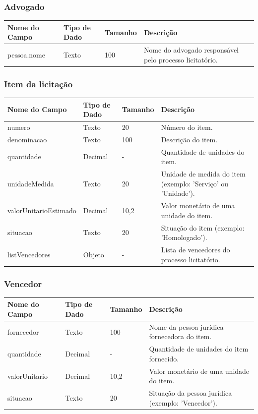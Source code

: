 \documentclass[
	12pt,				%
	oneside,			%
	a4paper,			%
	chapter=TITLE,		%
	section=TITLE,		%
	english,			%
	brazil				%
	]{abntex2}
\begin{document}
\newpage
\subsubsection*{Advogado}
\begin{longtable}{|p{4cm}|p{3cm}|p{2cm}|p{6cm}|}
\hline
\textbf{Nome do Campo} & \textbf{Tipo de Dado} & \textbf{Tamanho} & \textbf{Descrição} \\
\hline
pessoa.nome & Texto & 100 & Nome do advogado responsável pelo processo licitatório. \\
\hline
\end{longtable}

\subsubsection*{Item da licitação}
\begin{longtable}{|p{4cm}|p{3cm}|p{2cm}|p{6cm}|}
\hline
\textbf{Nome do Campo} & \textbf{Tipo de Dado} & \textbf{Tamanho} & \textbf{Descrição} \\
\hline
numero & Texto & 20 & Número do item. \\
\hline
denominacao & Texto & 100 & Descrição do item. \\
\hline
quantidade & Decimal & - & Quantidade de unidades do item. \\
\hline
unidadeMedida & Texto & 20 & Unidade de medida do item (exemplo: 'Serviço' ou 'Unidade'). \\
\hline
valorUnitarioEstimado & Decimal & 10,2 & Valor monetário de uma unidade do item. \\
\hline
situacao & Texto & 20 & Situação do item (exemplo: 'Homologado'). \\
\hline
listVencedores & Objeto & - & Lista de vencedores do processo licitatório. \\
\hline
\end{longtable}

\subsubsection*{Vencedor}
\begin{longtable}{|p{4cm}|p{3cm}|p{2cm}|p{6cm}|}
\hline
\textbf{Nome do Campo} & \textbf{Tipo de Dado} & \textbf{Tamanho} & \textbf{Descrição} \\
\hline
fornecedor & Texto & 100 & Nome da pessoa jurídica fornecedora do item. \\
\hline
quantidade & Decimal & - & Quantidade de unidades do item fornecido. \\
\hline
valorUnitario & Decimal & 10,2 & Valor monetário de uma unidade do item. \\
\hline
situacao & Texto & 20 & Situação da pessoa jurídica (exemplo: 'Vencedor'). \\
\hline
\end{longtable}
\end{document}
